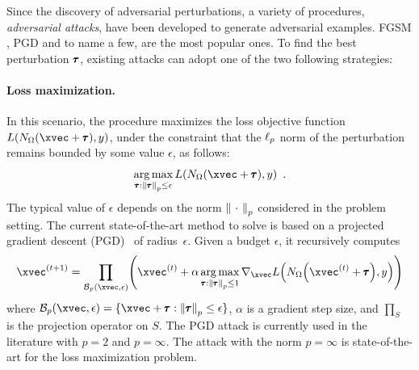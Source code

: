 Since the discovery of adversarial perturbations, a variety of procedures, \aka \emph{adversarial attacks}, have been developed to generate adversarial examples.
FGSM \cite{goodfellow2014explaining}, PGD \cite{madry2018towards} and \cite{carlini2017towards} to name a few, are the most popular ones.
To find the best perturbation $\pmb{\tau}$, existing attacks can adopt one of the two following strategies:

\paragraph{Loss maximization.}
In this scenario, the procedure maximizes the loss objective function $L(\nn_\weights(\xvec + \adv), y)$, under the constraint that the $\ell_p $ norm of the perturbation remains bounded by some value $\epsilon$, as follows:
\begin{equation} \label{equation:ch2-lossmax}
  \argmax_{\adv:\norm{\adv}_p \leq \epsilon} L(\nn_\weights(\xvec + \adv), y) \enspace.
\end{equation}
The typical value of $\epsilon$ depends on the norm $\norm{\ \cdot\ }_p$ considered in the problem setting.
The current state-of-the-art method to solve  is based on a projected gradient descent (PGD)~\cite{madry2018towards} of radius~$\epsilon$.
Given a budget $\epsilon$, it recursively computes
\begin{equation} \label{equation:ch2-projectionPGD}
  \xvec^{(t+1)} = \prod_{\mathcal{B}_p(\xvec,\epsilon)}\left(\xvec^{(t)}
    + \alpha \argmax_{\adv: \norm{\adv}_p \leq 1} \nabla_\xvec L\left( \nn_\weights \left(\xvec^{(t)} + \adv \right), y \right)
\right)
\end{equation}
where $\mathcal{B}_p(\xvec,\epsilon) = \{ \xvec + \adv:\norm{\adv}_p \leq \epsilon\}$, $\alpha$ is a gradient step size, and $\prod_S$ is the projection operator on $S$.
The PGD attack is currently used in the literature with $p=2$ and $p=\infty$.
The attack with the norm $p=\infty$ is state-of-the-art for the loss maximization problem. 

